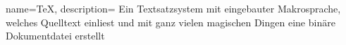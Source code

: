{
    name=TeX,
    description={
        Ein Textsatzsystem mit eingebauter Makrosprache, welches Quelltext einliest und mit ganz vielen magischen Dingen eine binäre Dokumentdatei erstellt
    }
}

\clearpage
\printglossary[title=Glossar, toctitle=Glossar]{}
\newpage
